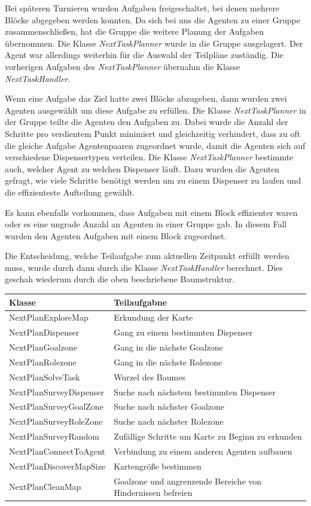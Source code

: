 Bei späteren Turnieren wurden Aufgaben freigeschaltet, bei denen mehrere Blöcke abgegeben werden konnten. Da sich bei uns die Agenten zu einer Gruppe zusammenschließen, hat die Gruppe die weitere Planung der Aufgaben übernommen. Die Klasse \emph{NextTaskPlanner} wurde in die Gruppe ausgelagert. Der Agent war allerdings weiterhin für die Auswahl der Teilpläne zuständig. Die vorherigen Aufgaben des \emph{NextTaskPlanner} übernahm die Klasse \emph{NextTaskHandler}. 

Wenn eine Aufgabe das Ziel hatte zwei Blöcke abzugeben, dann wurden zwei Agenten ausgewählt um diese Aufgabe zu erfüllen. Die Klasse \emph{NextTaskPlanner} in der Gruppe teilte die Agenten den Aufgaben zu. Dabei wurde die Anzahl der Schritte pro verdientem Punkt minimiert und gleichzeitig verhindert, dass zu oft die gleiche Aufgabe Agentenpaaren zugeordnet wurde, damit die Agenten sich auf verschiedene Dispensertypen verteilen. Die Klasse \emph{NextTaskPlanner} bestimmte auch, welcher Agent zu welchen Dispenser läuft. Dazu wurden die Agenten gefragt, wie viele Schritte benötigt werden um zu einem Dispenser zu laufen und die  effizienteste Aufteilung gewählt.

Es kann ebenfalls vorkommen, dass Aufgaben mit einem Block effizienter waren oder es eine ungrade Anzahl an Agenten in einer Gruppe gab. In diesem Fall wurden den Agenten Aufgaben mit einem Block zugeordnet.

Die Entscheidung, welche Teilaufgabe zum aktuellen Zeitpunkt erfüllt werden muss, wurde durch dann durch die Klasse \emph{NextTaskHandler} berechnet. Dies geschah wiederum durch die oben beschriebene Baumstruktur. \\

\begin{tabular}{l | p{6cm}}\label{Liste der Pläne}
Klasse & Teilaufgabne \\
\hline
NextPlanExploreMap & Erkundung der Karte\\
NextPlanDispenser & Gang zu einem bestimmten Dispenser\\
NextPlanGoalzone & Gang in die nächste Goalzone\\
NextPlanRolezone & Gang in die nächste Rolezone\\
NextPlanSolveTask & Wurzel des Baumes\\
NextPlanSurveyDispenser & Suche nach nächstem bestimmten Dispenser\\
NextPlanSurveyGoalZone & Suche nach nächster Goalzone\\
NextPlanSurveyRoleZone & Suche nach nächster Rolezone\\
NextPlanSurveyRandom & Zufällige Schritte um Karte zu Beginn zu erkunden\\
NextPlanConnectToAgent & Verbindung zu einem anderen Agenten aufbauen\\
NextPlanDiscoverMapSize & Kartengröße bestimmen\\
NextPlanCleanMap & Goalzone und angrenzende Bereiche von Hindernissen befreien\\
\end{tabular}

